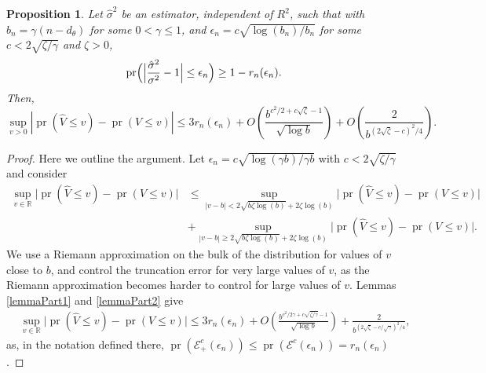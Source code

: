 \documentclass[10pt, reqno]{amsart}
\newtheorem{proposition}{Proposition}[section]
\numberwithin{equation}{section}
\newcommand{\pr}{\mathop{\mathrm{pr}}}
\begin{document}
\begin{appendix}
\begin{proposition}\label{prop:precise_rate}
	Let $\hat\sigma^2$ be an estimator, independent of $R^2$, such that with $b_n = \gamma (n-d_\theta)$ for some $0 <\gamma \leq 1$, and $\epsilon_n   =  c\sqrt{\log(b_n)/b_n}$ for some $c < 2\sqrt{\zeta/\gamma}$ and $\zeta > 0$,
	\[
	\pr\Bigl(\Bigl|\frac{\hat{\sigma}^2}{\sigma^2} - 1\Bigr|\leq \epsilon_n\Bigr)\geq 1-r_n(\epsilon_n).
	\]
	Then, 
	\[
	\sup_{v>0}|\pr(\hat V \leq v) - \pr( V \leq v)| \leq 3r_n(\epsilon_n) + O\left( \frac{b^{c^2/2 + c\sqrt{\zeta} - 1}}{\sqrt{\log b}}\right) + O\left( \frac{2}{b^{(2\sqrt{\zeta} - c)^2/4}} \right).
	\]       
\end{proposition}

\begin{proof}
	Here we outline the argument. Let $\epsilon_n   = c \sqrt{\log(\gamma b)/\gamma b}$ with $c <  2\sqrt{\zeta/\gamma}$ and consider
	\begin{align*}
		\sup_{v \in \mathbb{R} }\bigl|\pr(\hat V \leq v) - \pr(V \leq v)\bigr| 
		&\leq \sup_{|v - b| < 2\sqrt{b\zeta\log (b)} + 2\zeta\log (b) }\bigl|\pr(\hat V \leq v) - \pr(V \leq v)\bigr| \\
		&+ \sup_{|v - b| \geq 2\sqrt{b\zeta\log (b)} + 2\zeta\log (b) }\bigl|\pr(\hat V \leq v) - \pr(V \leq v)\bigr|.
	\end{align*}
	We use a Riemann approximation on the bulk of the distribution for values of $v$ close to $b$, and control the truncation error for very large values of $v$, as the Riemann approximation becomes harder to control for large values of $v$. Lemmas \ref{lemmaPart1} and \ref{lemmaPart2} give
	\begin{align*}
		&\sup_{v \in \mathbb{R} }\bigl|\pr(\hat V \leq v) - \pr(V \leq v)\bigr|  \leq 3r_n(\epsilon_n) + O\left( \frac{b^{c^2/2\gamma + c\sqrt{\zeta/\gamma} - 1}}{\sqrt{\log b}}\right) +\frac{2}{b^{(2\sqrt{\zeta} - c/\sqrt{\gamma})^2/4}},
	\end{align*}
	as, in the notation defined there, $\pr(\mathcal{E}_{+}^c(\epsilon_n)) \leq \pr(\mathcal{E}^c(\epsilon_n)) = r_n(\epsilon_n)$. 
\end{proof}


\end{appendix}
\end{document}
